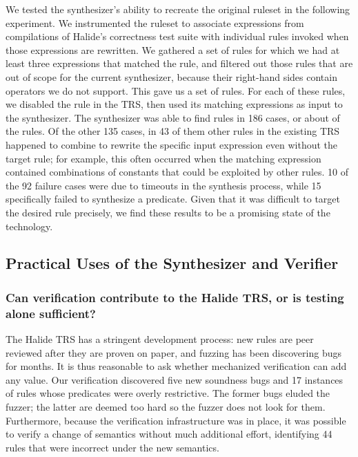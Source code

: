 \documentclass[acmsmall,review,anonymous]{acmart}\settopmatter{printfolios=true,printccs=false,printacmref=false}
\begin{document}
We tested the synthesizer's ability to recreate the original ruleset in the following experiment. We instrumented the ruleset to associate expressions from compilations of Halide's correctness test suite with individual rules invoked when those expressions are rewritten. We gathered a set of rules for which we had at least three expressions that matched the rule, and filtered out those rules that are out of scope for the current synthesizer, because their right-hand sides contain operators we do not support. This gave us a set of \NumRulesInCorrectnessExperiment{} rules. For each of these rules, we disabled the rule in the TRS, then used its matching expressions as input to the synthesizer. The synthesizer was able to find rules in 186 cases, or about \PercentRulesResynthesized{} of the rules. Of the other 135 cases, in 43 of them other rules in the existing TRS happened to combine to rewrite the specific input expression even without the target rule; for example, this often occurred when the matching expression contained combinations of constants that could be exploited by other rules. 10 of the 92 failure cases were due to timeouts in the synthesis process, while 15 specifically failed to synthesize a predicate. Given that it was difficult to target the desired rule precisely, we find these results to be a promising state of the technology.


\subsection{Practical Uses of the Synthesizer and Verifier}

\subsubsection{Can verification contribute to the Halide TRS, or is testing alone sufficient?}
\label{sec:eval-correctness}

The Halide TRS has a stringent development process: new rules are peer reviewed after they are proven on paper, and fuzzing has been discovering bugs for months. It is thus reasonable to ask whether mechanized verification can add any value. Our verification discovered five new soundness bugs and 17 instances of rules whose predicates were overly restrictive. The former bugs eluded the fuzzer; the latter are deemed too hard so the fuzzer does not look for them. Furthermore, because the verification infrastructure was in place, it was possible to verify a change of semantics without much additional effort, identifying 44 rules that were incorrect under the new semantics.
\end{document}
